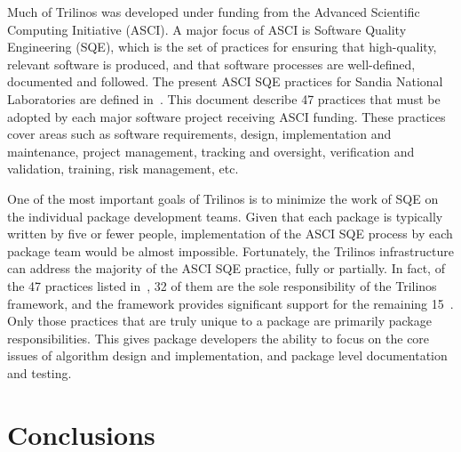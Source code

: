 \documentclass[acmtoms,acmnow]{acmtrans2m}
\begin{document}
Much of Trilinos was developed under funding from the Advanced
Scientific Computing Initiative (ASCI).  A major focus of ASCI is
Software Quality Engineering (SQE), which is the set of practices for
ensuring that
high-quality, relevant software is produced, and that software
processes are well-defined, documented and followed.  The present ASCI
SQE practices for Sandia National Laboratories are defined
in~\cite{ASCISQE2003}.  This document describe 47 practices that must
be adopted by each major software project receiving ASCI funding.
These practices cover areas such as software requirements, design,
implementation and maintenance, project management, tracking and
oversight, verification and validation, training, risk management,
etc.  

One of the most important goals of Trilinos is to minimize the work
of SQE on the individual package development teams.  Given
that each package is typically written by five or fewer people,
implementation of the ASCI SQE process by each package team would be
almost impossible.  Fortunately, the Trilinos infrastructure
can address the majority of the ASCI SQE practice, fully or
partially.  In fact, of the 47 practices listed in~\cite{ASCISQE2003},
32 of them are the sole responsibility of the Trilinos framework, and
the framework provides significant support for the remaining
15~\cite{Trilinos-Dev-Guide-II}.   Only those practices that are truly
unique to a package are primarily package responsibilities.  This gives
package developers the ability to focus on the core issues of
algorithm design and implementation, and package level documentation
and testing.

\section{Conclusions}
\end{document}
